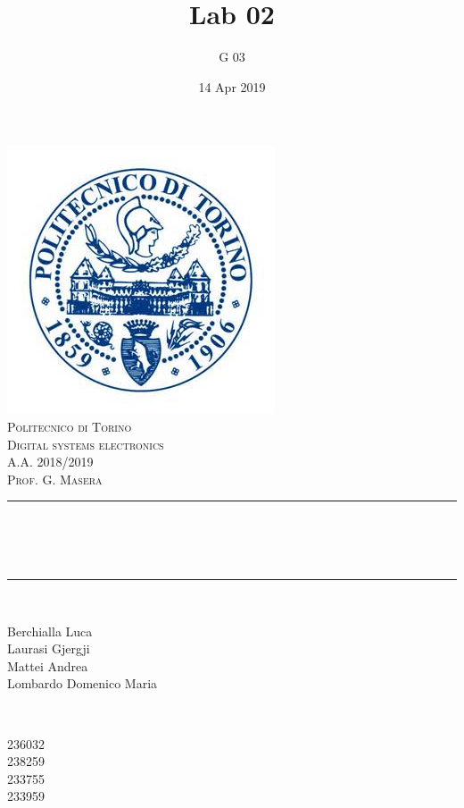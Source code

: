 \documentclass[12pt]{article}
\title{Lab 02}													%
\author{G 03}														%
\date{14 Apr 2019}														%
\makeatletter
\let\thetitle\@title
\let\thedate\@date
\makeatother
\begin{document}

\begin{titlepage}
	\centering
    \vspace*{0.5 cm}
    \includegraphics[scale = 0.75]{polito.jpg}\\[1.0 cm]				%
    \textsc{\LARGE Politecnico di Torino}\\[2.0 cm]						%
	\textsc{\Large Digital systems electronics\\ A.A. 2018/2019}\\[0.5 cm]		%
	\textsc{\Large Prof. G. Masera}\\[0.5 cm]		%
	\rule{\linewidth}{0.2 mm} \\[0.4 cm]
	{ \huge \bfseries \thetitle \\ \small \thedate}\\
	\rule{\linewidth}{0.2 mm} \\[1.5 cm]
	
	\begin{minipage}{0.4\textwidth}
		\begin{flushleft} \large
			Berchialla Luca\\												%
			Laurasi Gjergji
			\\
			
			Mattei Andrea\\
            Lombardo Domenico Maria\\
            
			\end{flushleft}
			\end{minipage}~
			\begin{minipage}{0.4\textwidth}
            
			\begin{flushright} \large
			236032\\													%
			238259\\
            233755\\
            233959\\
            
		\end{flushright}
        
	\end{minipage}\\[2 cm]
	
\end{titlepage}
\end{document}
